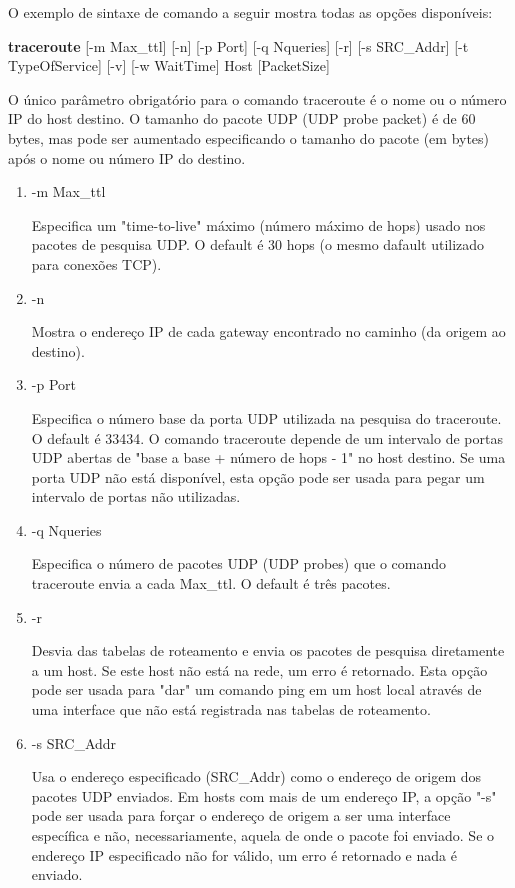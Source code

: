 \documentclass[
	article,			%
	11pt,				%
	oneside,			%
	a4paper,			%
	english,			%
	brazil,				%
	sumario=tradicional
	]{abntex2}
\begin{document}
O exemplo de sintaxe de comando a seguir mostra todas as opções disponíveis:

\textbf{traceroute }[-m Max\_ttl] [-n] [-p Port] [-q Nqueries] [-r] [-s SRC\_Addr] [-t TypeOfService] [-v] [-w WaitTime] Host [PacketSize]

O único parâmetro obrigatório para o comando traceroute é o nome ou o número IP do host destino. O tamanho do pacote UDP (UDP probe packet) é de 60 bytes, mas pode ser aumentado especificando o tamanho do pacote (em bytes) após o nome ou número IP do destino.

\begin{enumerate}
	\item -m Max\_ttl
	
	Especifica um "time-to-live" máximo (número máximo de hops) usado nos pacotes de pesquisa UDP. O default é 30 hops (o mesmo dafault utilizado para conexões TCP).
	
	\item -n
	
	Mostra o endereço IP de cada gateway encontrado no caminho (da origem ao destino).
	
		
	\item -p Port   
	
	Especifica o número base da porta UDP utilizada na pesquisa do traceroute. O default é 33434. O comando traceroute depende de um intervalo de portas UDP abertas de "base a base + número de hops - 1" no host destino. Se uma porta UDP não está disponível, esta opção pode ser usada para pegar um intervalo de portas não utilizadas.

	\item -q Nqueries 
	
	Especifica o número de pacotes UDP (UDP probes) que o comando traceroute envia a cada Max\_ttl. O default é três pacotes.

	\vspace{1cm}
	\item -r  	
	
	Desvia das tabelas de roteamento e envia os pacotes de pesquisa diretamente a um host. Se este host não está na rede, um erro é retornado. Esta opção pode ser usada para "dar" um comando ping em um host local através de uma interface que não está registrada nas tabelas de roteamento.
	
	\item -s SRC\_Addr
		
	Usa o endereço especificado (SRC\_Addr) como o endereço de origem dos pacotes UDP enviados. Em hosts com mais de um endereço IP, a opção "-s" pode ser usada para forçar o endereço de origem a ser uma interface específica e não, necessariamente, aquela de onde o pacote foi enviado. Se o endereço IP especificado não for válido, um erro é retornado e nada é enviado.
	


\end{enumerate}
\end{document}
